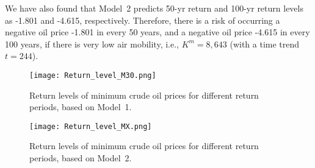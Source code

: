 \documentclass[review]{elsarticle}
\begin{document}
We have also found that Model~2 predicts 50-yr return and 100-yr return levels as -1.801 and -4.615, respectively. Therefore, there is a risk of occurring a negative oil price -1.801 in every 50 years, and a negative oil price -4.615 in every 100 years, if there is very low air mobility, i.e., $K^m=8,643$ (with a time trend $t=244$).

\begin{figure*}[!ht]
	\centering			
		\texttt{[image: Return\_level\_M30.png]}
	\caption{Return levels of minimum crude oil prices for different return periods, based on Model~1.}
	\label{RTL:M1}
\end{figure*}


\begin{figure*}[!ht]
	\centering			
		\texttt{[image: Return\_level\_MX.png]}
	\caption{Return levels of minimum crude oil prices for different return periods, based on Model~2.}
	\label{RTL:M2}
\end{figure*}



\end{document}
